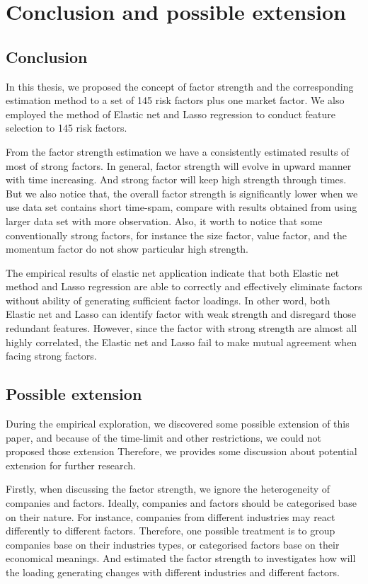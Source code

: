 	\chapter{Conclusion and possible extension}\label{Conclusion}
		\section{Conclusion}
In this thesis, we proposed the concept of factor strength and the corresponding estimation method to a set of 145 risk factors plus one market factor.
We also employed the method of Elastic net and Lasso regression to conduct feature selection to 145 risk factors.

From the factor strength estimation we have a consistently estimated results of most of strong factors.
In general, factor strength will evolve in upward manner with time increasing.
And strong factor will keep high strength through times.
But we also notice that, the overall factor strength is significantly lower when we use data set contains short time-spam, compare with results obtained from using larger data set with more observation.
Also, it worth to notice that some conventionally strong factors, for instance the size factor, value factor, and the momentum factor do not show particular high strength.

The empirical results of elastic net application indicate that both Elastic net method and Lasso regression are able to correctly and effectively eliminate factors without ability of generating sufficient factor loadings.
In other word, both Elastic net and Lasso can identify factor with weak strength and disregard those redundant features.
However, since the factor with strong strength are almost all highly correlated, the Elastic net and Lasso fail to make mutual agreement when facing strong factors.

\section{Possible extension}
During the empirical exploration, we discovered some possible extension of this paper, and because of the time-limit and other restrictions, we could not proposed those extension
Therefore, we provides some discussion about potential extension for further research.

Firstly, when discussing the factor strength, we ignore the heterogeneity of companies and factors.
Ideally, companies and factors should be categorised base on their nature.
For instance, companies from different industries may react differently to different factors.
Therefore, one possible treatment is to group companies base on their industries types, or categorised factors base on their economical meanings.
And estimated the factor strength to investigates how will the loading generating changes with different industries and different factors.

